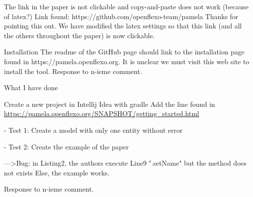 \documentclass[10pt]{article}
\begin{document}

\begin{response}{The link in the paper is not clickable and copy-and-paste does not work (because of latex?) Link found: https://github.com/openflexo-team/pamela}
Thanks for pointing this out. We have modified the latex settings so that this link (and all the others throughout the paper) is now clickable.
\end{response}

\begin{response}{Installation
The readme of the GitHub page should link to the installation page found in https://pamela.openflexo.org. It is unclear we must visit this web site to install the tool.
}
  Response to n-ieme comment.
\end{response}

\begin{response}{
What I have done

Create a new project in Intellij Idea with gradle
Add the line found in \url{https://pamela.openflexo.org/SNAPSHOT/getting_started.html}

- Test 1: Create a model with only one entity without error

- Test 2: Create the example of the paper

--->Bug: in Listing2, the authors execute Line9 ".setName" but the method does not exists
Else, the example works.


}
  Response to n-ieme comment.
\end{response}
\end{document}
